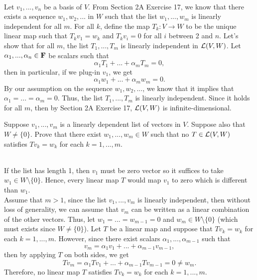 \begin{solution}
    \\ Let $v_1, ..., v_n$ be a basis of $V$. From Section 2A Exercise 17, we know that there exists a sequence $w_1, w_2, ...$ in $W$ such that the list $w_1, ..., w_m$ is linearly independent for all $m$. For all $k$, define the map $T_k : V \to W$ to be the unique linear map such that $T_k v_1 = w_k$ and $T_k v_i = 0$ for all $i$ between 2 and $n$. Let's show that for all $m$, the list $T_1, ..., T_m$ is linearly independent in $\mathcal{L}(V,W)$. Let $\alpha_1, ..., \alpha_n \in \mathbf{F}$ be scalars such that $$\alpha_1 T_1 + ... + \alpha_m T_m = 0,$$
    then in particular, if we plug-in $v_1$, we get
    $$\alpha_1 w_1 + ... + \alpha_m w_m = 0.$$
    By our assumption on the sequence $w_1, w_2, ...$, we know that it implies that $\alpha_1 = ... = \alpha_m = 0$. Thus, the list $T_1, ..., T_m$ is linearly independent. Since it holds for all $m$, then by Section 2A Exercise 17, $\mathcal{L}(V,W)$ is infinite-dimensional. \\
\end{solution}

\begin{exercise}
    Suppose $v_1, ..., v_m$ is a linearly dependent list of vectors in $V$. Suppose also that $W \neq \{0\}$. Prove that there exist $w_1, ..., w_m \in W$ such that no $T \in \mathcal{L}(V,W)$ satisfies $Tv_k = w_k$ for each $k = 1, ..., m$. \\
\end{exercise}

\begin{solution}
    \\ If the list has length 1, then $v_1$ must be zero vector so it suffices to take $w_1 \in W\setminus \{0\}$. Hence, every linear map $T$ would map $v_1$ to zero which is different than $w_1$. \\
    Assume that $m > 1$, since the list $v_1, ..., v_m$ is linearly independent, then without loss of generality, we can assume that $v_m$ can be written as a linear combination of the other vectors. Thus, let $w_1 = ... = w_{m-1} = 0$ and $w_m \in W \setminus \{0\}$ (which must exists since $W \neq \{0\}$). Let $T$ be a linear map and suppose that $T v_k = w_k$ for each $k = 1, ..., m$. However, since there exist scalars $\alpha_1, ..., \alpha_{m-1}$ such that
    $$v_m = \alpha_1 v_1 + ... + \alpha_{m-1}v_{m-1},$$
    then by applying $T$ on both sides, we get
    $$Tv_m = \alpha_1 Tv_1 + ... + \alpha_{m-1}Tv_{m-1} = 0 \neq w_m.$$
    Therefore, no linear map $T$ satisfies $T v_k = w_k$ for each $k = 1, ..., m$.\\
\end{solution}

